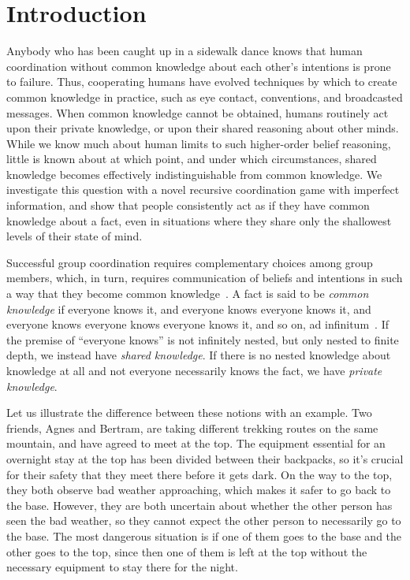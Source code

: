 \documentclass[twocolumn,a4paper,superscriptaddress,nofootinbib]{revtex4}
\begin{document}
\section{Introduction}
Anybody who has been caught up in a sidewalk dance knows that human coordination without common knowledge about each other's intentions is prone to failure. Thus, cooperating humans have evolved techniques by which to create common knowledge in practice, such as eye contact, conventions, and broadcasted messages. When common knowledge cannot be obtained, humans routinely act upon their private knowledge, or upon their shared reasoning about other minds. While we know much about human limits to such higher-order belief reasoning, little is known about at which point, and under which circumstances, shared knowledge becomes effectively indistinguishable from common knowledge. We investigate this question with a novel recursive coordination game with imperfect information, and show that people consistently act as if they have common knowledge about a fact, even in situations where they share only the shallowest levels of their state of mind. 

Successful group coordination requires complementary choices among group members, which, in turn, requires communication of beliefs and intentions in such a way that they become common knowledge~\citep{fagin1995reasoning}. A fact is said to be \textit{common knowledge} if everyone knows it, and everyone knows everyone knows it, and everyone knows everyone knows everyone knows it, and so on, ad infinitum~\citep{lewis1969convention, clark1981definite, schelling1980strategy, aumann1976agreeing}. If the premise of ``everyone knows'' is not infinitely nested, but only nested to finite depth, we instead have \emph{shared knowledge}. If there is no nested knowledge about knowledge at all and not everyone necessarily knows the fact, we have \emph{private knowledge}.

Let us illustrate the difference between these notions with an example. Two friends, Agnes and Bertram, are taking different trekking routes on the same mountain, and have agreed to meet at the top. 
The equipment essential for an overnight stay at the top has been divided between their backpacks, so it's crucial for their safety that they meet there before it gets dark. 
On the way to the top, they both observe bad weather approaching, which makes it safer to go back to the base. However, they are both uncertain about whether the other person has seen the bad weather, so they cannot expect the other person to necessarily go to the base. The most dangerous situation is if one of them goes to the base and the other goes to the top, since then one of them is left at the top without the necessary equipment to stay there for the night. 
\end{document}
